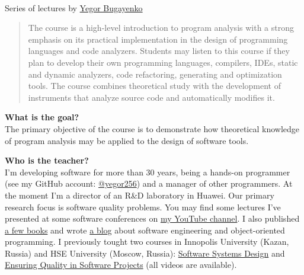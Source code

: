 \documentclass[nobrand,anonymous,nodate,nosecurity]{huawei}
\begin{document}
{\\
Series of lectures by \href{https://www.yegor256.com}{Yegor Bugayenko}


\begin{abstract}
The course is a high-level introduction to program analysis with a
strong emphasis on its practical implementation in the design of programming languages
and code analyzers. Students may listen to this
course if they plan to develop their own programming languages,
compilers, IDEs, static and dynamic analyzers, code refactoring, generating and optimization tools.
The course combines theoretical study with the development of
instruments that analyze source code and automatically modifies it.
\end{abstract}


\textbf{What is the goal?}\\
The primary objective of the course is to demonstrate
how theoretical knowledge of program analysis may be applied to
the design of software tools.

\textbf{Who is the teacher?}\\
I'm developing software for more than 30 years, being a hands-on programmer
(see my GitHub account: \href{https://github.com/yegor256}{@yegor256})
and a manager of other programmers. At the moment I'm a director
of an R\&D laboratory in Huawei. Our primary research focus is
software quality problems. You may find some lectures I've presented
at some software conferences on
\href{https://www.youtube.com/channel/UCr9qCdqXLm2SU0BIs6d_68Q}{my YouTube channel}.
I also published \href{https://www.yegor256.com/books.html}{a few books}
and wrote \href{https://www.yegor256.com/contents.html}{a blog} about software engineering
and object-oriented programming.
I previously tought two courses in
Innopolis University (Kazan, Russia)
and HSE University (Moscow, Russia):
\href{https://github.com/yegor256/ssd16}{Software Systems Design}
and
\href{https://github.com/yegor256/eqsp}{Ensuring Quality in Software Projects}
(all videos are available).

}
\end{document}
